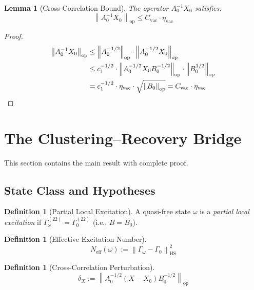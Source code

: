 \documentclass[11pt,a4paper]{article}
\theoremstyle{plain}
\newtheorem{lemma}[theorem]{Lemma}
\theoremstyle{definition}
\newtheorem{definition}[theorem]{Definition}
\theoremstyle{remark}
\newcommand{\opnorm}[1]{\left\lVert #1 \right\rVert_{\mathrm{op}}}
\newcommand{\hsnorm}[1]{\left\lVert #1 \right\rVert_{\mathrm{HS}}}
\newcommand{\etavac}{\eta_{\mathrm{vac}}}
\newcommand{\Cvac}{C_{\mathrm{vac}}}
\newcommand{\Neff}{N_{\mathrm{eff}}}
\begin{document}
\begin{lemma}[Cross-Correlation Bound]\label{lem:crossbound}
The operator $A_0^{-1} X_0$ satisfies:
\begin{equation}
\opnorm{A_0^{-1} X_0} \le \Cvac \cdot \etavac
\end{equation}
\end{lemma}

\begin{proof}
\begin{align}
\opnorm{A_0^{-1} X_0}
&\le \opnorm{A_0^{-1/2}} \cdot \opnorm{A_0^{-1/2} X_0} \\
&\le c_1^{-1/2} \cdot \opnorm{A_0^{-1/2} X_0 B_0^{-1/2}} \cdot \opnorm{B_0^{1/2}} \\
&= c_1^{-1/2} \cdot \etavac \cdot \sqrt{\opnorm{B_0}} = \Cvac \cdot \etavac
\qedhere
\end{align}
\end{proof}

\section{The Clustering--Recovery Bridge}\label{sec:bridge}

This section contains the main result with complete proof.

\subsection{State Class and Hypotheses}

\begin{definition}[Partial Local Excitation]
A quasi-free state $\omega$ is a \emph{partial local excitation} if
$\Gamma_\omega^{(22)} = \Gamma_0^{(22)}$ (i.e., $B = B_0$).
\end{definition}

\begin{definition}[Effective Excitation Number]
\begin{equation}
\Neff(\omega) := \hsnorm{\Gamma_\omega - \Gamma_0}^2
\end{equation}
\end{definition}

\begin{definition}[Cross-Correlation Perturbation]
\begin{equation}
\delta_X := \opnorm{A_0^{-1/2}(X - X_0)B_0^{-1/2}}
\end{equation}
\end{definition}
\end{document}
